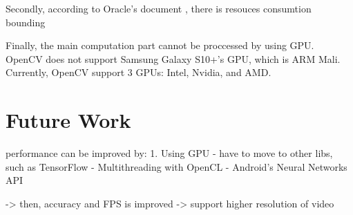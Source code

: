         Secondly, according to Oracle's document \cite{ORACLE-THREAD-POOL}, there is resouces consumtion bounding

        Finally, the main computation part cannot be proccessed by using GPU.
        OpenCV does not support Samsung Galaxy S10+'s GPU, which is ARM Mali.
        Currently, OpenCV support 3 GPUs: Intel, Nvidia, and AMD.

    \section{Future Work}
        performance can be improved by:
            1. Using GPU
                - have to move to other libs, such as TensorFlow
                - Multithreading with OpenCL
                - Android's Neural Networks API

                -> then, accuracy and FPS is improved
                -> support higher resolution of video

